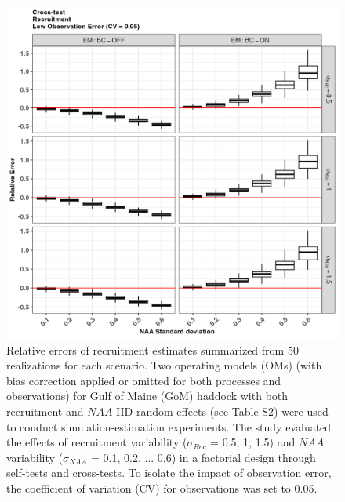 \documentclass[
  12pt,
]{article}
\begin{document}
\begin{figure}[H]
\centering
\includegraphics[width=\textwidth]{Revised_Figures&Tables/Recruitment_low_cross_RE.PNG}
\caption{Relative errors of recruitment estimates summarized from 50 realizations for each scenario. Two operating models (OMs) (with bias correction applied or omitted for both processes and observations) for Gulf of Maine (GoM) haddock with both recruitment and $NAA$ IID random effects (see Table S2) were used to conduct simulation-estimation experiments. The study evaluated the effects of recruitment variability ($\sigma_{Rec}$ = 0.5, 1, 1.5) and $NAA$ variability ($\sigma_{NAA}$ = 0.1, 0.2, ... 0.6) in a factorial design through self-tests and cross-tests. To isolate the impact of observation error, the coefficient of variation (CV) for observations was set to 0.05.}
\label{fig:supp_Recruitment_low_cross_RE}
\end{figure}
\end{document}
